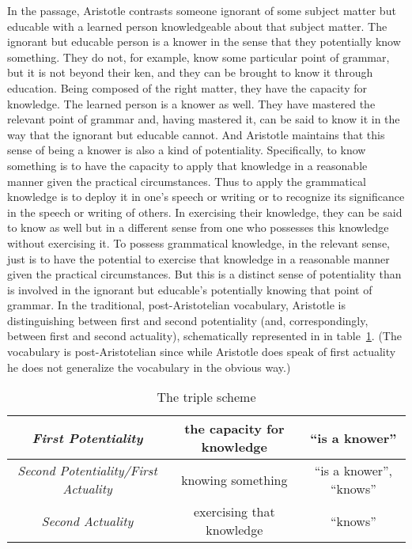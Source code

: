 In the passage, Aristotle contrasts someone ignorant of some subject matter but educable with a learned person knowledgeable about that subject matter. The ignorant but educable person is a knower in the sense that they potentially know something. They do not, for example, know some particular point of grammar, but it is not beyond their ken, and they can be brought to know it through education. Being composed of the right matter, they have the capacity for knowledge. The learned person is a knower as well. They have mastered the relevant point of grammar and, having mastered it, can be said to know it in the way that the ignorant but educable cannot. And Aristotle maintains that this sense of being a knower is also a kind of potentiality. Specifically, to know something is to have the capacity to apply that knowledge in a reasonable manner given the practical circumstances. Thus to apply the grammatical knowledge is to deploy it in one's speech or writing or to recognize its significance in the speech or writing of others. In exercising their knowledge, they can be said to know as well but in a different sense from one who possesses this knowledge without exercising it. To possess grammatical knowledge, in the relevant sense, just is to have the potential to exercise that knowledge in a reasonable manner given the practical circumstances. But this is a distinct sense of potentiality than is involved in the ignorant but educable's potentially knowing that point of grammar.  In the traditional, post-Aristotelian vocabulary, Aristotle is distinguishing between first and second potentiality (and, correspondingly, between first and second actuality), schematically represented in in table~\ref{tab:triple}. (The vocabulary is post-Aristotelian since while Aristotle does speak of first actuality he does not generalize the vocabulary in the obvious way.)

\begin{table}[htbp]
	\centering
		\begin{tabular}{ccc}
			\hline
			\emph{First Potentiality} & the capacity for knowledge & ``is a knower''\\
			\hline
			\emph{Second Potentiality/First Actuality} & knowing something & ``is a knower'', ``knows''\\
			\hline
			\emph{Second Actuality} & exercising that knowledge & ``knows''\\
			\hline
		\end{tabular}
	\caption{The triple scheme}
	\label{tab:triple}
\end{table}

